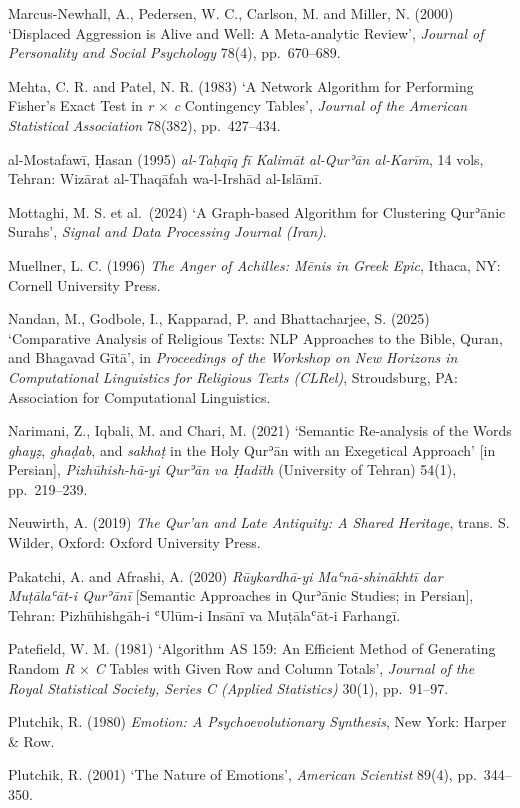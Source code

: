 \documentclass[11pt,a4paper]{article}
\begin{document}
Marcus-Newhall, A., Pedersen, W. C., Carlson, M. and Miller, N. (2000)
`Displaced Aggression is Alive and Well: A Meta-analytic Review',
\emph{Journal of Personality and Social Psychology} 78(4), pp.~670--689.

Mehta, C. R. and Patel, N. R. (1983) `A Network Algorithm for Performing
Fisher's Exact Test in \emph{r} × \emph{c} Contingency Tables',
\emph{Journal of the American Statistical Association} 78(382),
pp.~427--434.

al-Mostafawī, Ḥasan (1995) \emph{al-Taḥqīq fī Kalimāt al-Qurʾān
al-Karīm}, 14 vols, Tehran: Wizārat al-Thaqāfah wa-l-Irshād al-Islāmī.

Mottaghi, M. S. et al.~(2024) `A Graph-based Algorithm for Clustering
Qurʾānic Surahs', \emph{Signal and Data Processing Journal (Iran)}.

Muellner, L. C. (1996) \emph{The Anger of Achilles: Mēnis in Greek
Epic}, Ithaca, NY: Cornell University Press.

Nandan, M., Godbole, I., Kapparad, P. and Bhattacharjee, S. (2025)
`Comparative Analysis of Religious Texts: NLP Approaches to the Bible,
Quran, and Bhagavad Gītā', in \emph{Proceedings of the Workshop on New
Horizons in Computational Linguistics for Religious Texts (CLRel)},
Stroudsburg, PA: Association for Computational Linguistics.

Narimani, Z., Iqbali, M. and Chari, M. (2021) `Semantic Re-analysis of
the Words \emph{ghayẓ}, \emph{ghaḍab}, and \emph{sakhaṭ} in the Holy
Qurʾān with an Exegetical Approach' {[}in Persian{]},
\emph{Pizhūhish-hā-yi Qurʾān va Ḥadīth} (University of Tehran) 54(1),
pp.~219--239.

Neuwirth, A. (2019) \emph{The Qur'an and Late Antiquity: A Shared
Heritage}, trans. S. Wilder, Oxford: Oxford University Press.

Pakatchi, A. and Afrashi, A. (2020) \emph{Rūykardhā-yi Maʿnā-shinākhtī
dar Muṭālaʿāt-i Qurʾānī} {[}Semantic Approaches in Qurʾānic Studies; in
Persian{]}, Tehran: Pizhūhishgāh-i ʿUlūm-i Insānī va Muṭālaʿāt-i
Farhangī.

Patefield, W. M. (1981) `Algorithm AS 159: An Efficient Method of
Generating Random \emph{R} × \emph{C} Tables with Given Row and Column
Totals', \emph{Journal of the Royal Statistical Society, Series C
(Applied Statistics)} 30(1), pp.~91--97.

Plutchik, R. (1980) \emph{Emotion: A Psychoevolutionary Synthesis}, New
York: Harper \& Row.

Plutchik, R. (2001) `The Nature of Emotions', \emph{American Scientist}
89(4), pp.~344--350.
\end{document}
